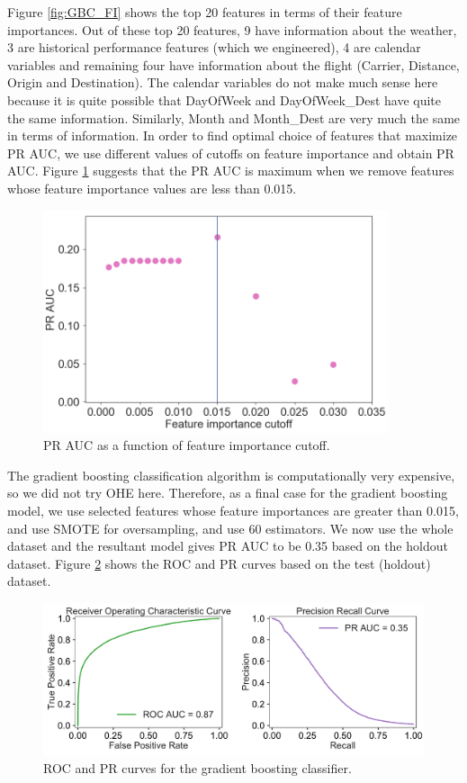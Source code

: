 \documentclass[12pt]{article}
\begin{document}
Figure \ref{fig:GBC_FI} shows the top 20 features in terms of their feature importances. Out of these top 20 features, 9 have information about the weather, 3 are historical performance features (which we engineered), 4 are calendar variables and remaining four have information about the flight (Carrier, Distance, Origin and Destination). The calendar variables do not make much sense here because it is quite possible that DayOfWeek and DayOfWeek\_Dest have quite the same information. Similarly, Month and Month\_Dest are very much the same in terms of information. In order to find optimal choice of features that maximize PR AUC, we use different values of cutoffs on feature importance and obtain PR AUC. Figure \ref{fig:GBC_FI_Cutoff} suggests that the PR AUC is maximum when we remove features whose feature importance values are less than 0.015.
\begin{figure}[!h]
\begin{center}
\includegraphics[width=4in]{GBC_FI_Cutoff.pdf}
\end{center}
\caption{\label{fig:GBC_FI_Cutoff}
PR AUC as a function of feature importance cutoff.}
\end{figure}
The gradient boosting classification algorithm is computationally very expensive, so we did not try OHE here. Therefore, as a final case for the gradient boosting model, we use selected features whose feature importances are greater than 0.015, and use SMOTE for oversampling, and use 60 estimators. We now use the whole dataset and the resultant model gives PR AUC to be 0.35 based on the holdout dataset. Figure \ref{fig:GBC} shows the ROC and PR curves based on the test (holdout) dataset.
 \begin{figure}[!h]
\begin{center}
\includegraphics[width=6in]{GBC_ROC_PR_plots.pdf}
\end{center}
\caption{\label{fig:GBC}
ROC and PR curves for the gradient boosting classifier.}
\end{figure}
\end{document}
